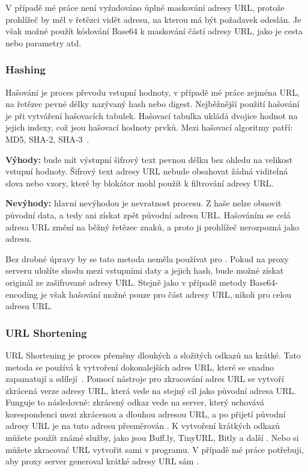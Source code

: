 V případě mé práce není vyžadováno úplné maskování adresy URL, protože prohlížeč by měl v řetězci vidět adresu, na kterou má být požadavek odeslán. Je však možné použít kódování Base64 k maskování částí adresy URL, jako je cesta nebo parametry atd.

\subsubsection*{Hashing}
Hašování je proces převodu vstupní hodnoty, v případě mé práce zejména URL, na řetězec pevné délky nazývaný hash nebo digest. Nejběžnější použití hašování je při vytváření hašovacích tabulek. Hašovací tabulka ukládá dvojice hodnot na jejich indexy, což jsou hašovací hodnoty prvků. Mezi hašovací algoritmy patří: MD5, SHA-2, SHA-3~\cite{hash}. 

\textbf{Výhody:} bude mít výstupní šifrový text pevnou délku bez ohledu na velikost vstupní hodnoty. Šifrový text adresy URL nebude obsahovat žádná viditelná slova nebo vzory, které by blokátor mohl použít k filtrování adresy URL.

\textbf{Nevýhody:} hlavní nevýhodou je nevratnost procesu. Z haše nelze obnovit původní data, a tedy ani získat zpět původní adresu URL. Hašováním se celá adresa URL změní na běžný řetězec znaků, a proto ji prohlížeč nerozpozná jako adresu.

Bez drobné úpravy by se tato metoda neměla používat pro . Pokud na proxy serveru uložíte shodu mezi vstupními daty a jejich hash, bude možné získat originál ze zašifrované adresy URL. Stejně jako v případě metody Base64-encoding je však hašování možné pouze pro část adresy URL, nikoli pro celou adresu URL.

\subsubsection*{URL Shortening}
URL Shortening je proces přeměny dlouhých a složitých odkazů na krátké. Tato metoda se používá k vytvoření dokonalejších adres URL, které se snadno zapamatují a sdílejí~\cite{urlshort}. Pomocí nástroje pro zkracování adres URL se vytvoří zkrácená verze adresy URL, která vede na stejný cíl jako původní adresa URL. Funguje to následovně: zkrácený odkaz vede na server, který uchovává korespondenci mezi zkrácenou a dlouhou adresou URL, a po přijetí původní adresy URL je na tuto adresu přesměrován \cite{urlshortJS}. K vytvoření krátkých odkazů můžete použít známé služby, jako jsou Buff.ly, TinyURL, Bitly a další \cite{urlshort}. Nebo si můžete zkracovač URL vytvořit sami v programu. V případě mé práce potřebuji, aby proxy server generoval krátké adresy URL sám \cite{urlshortJS}. 

